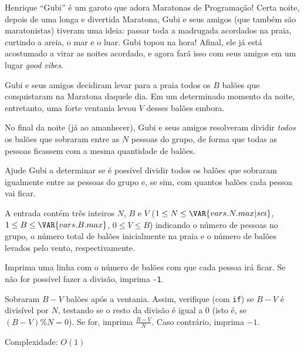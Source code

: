 Henrique ``Gubi'' é um garoto que adora Maratonas de Programação! Certa noite, depois de uma longa e divertida Maratona, Gubi e seus amigos (que também são maratonistas) tiveram uma ideia: passar toda a madrugada acordados na praia, curtindo a areia, o mar e o luar.  Gubi topou na hora! Afinal, ele já está acostumado a virar as noites acordado, e agora fará isso com seus amigos em um lugar \textit{good vibes}.

Gubi e seus amigos decidiram levar para a praia todos os $B$ balões que conquistaram na Maratona daquele dia. Em um determinado momento da noite, entretanto, uma forte ventania levou $V$ desses balões embora.

No final da noite (já ao amanhecer), Gubi e seus amigos resolveram dividir \textit{todos} os balões que sobraram entre as $N$ pessoas do grupo, de forma que todas as pessoas ficassem com a mesma quantidade de balões.

Ajude Gubi a determinar se é possível dividir todos os balões que sobraram igualmente entre as pessoas do grupo e, se sim, com quantos balões cada pessoa vai ficar.


A entrada contém três inteiros $N$, $B$ e $V$
($1 \leq N \leq \VAR{vars.N.max | sci}$, $1 \leq B \leq \VAR{vars.B.max}$, $0 \leq V \leq B$)
indicando o número de pessoas no grupo, o número total de balões inicialmente na
praia e o número de balões levados pelo vento, respectivamente.

Imprima uma linha com o número de balões com que cada pessoa irá ficar. Se não
for possível fazer a divisão, imprima \texttt{-1}.

Sobraram $B-V$ balões após a ventania. Assim, verifique (com \texttt{if}) se
$B-V$ é divisível por $N$, testando se o resto da divisão é igual a 0 (isto é,
        se $(B-V) \% N = 0$). Se for, imprima $\displaystyle\frac{B-V}{N}$. Caso contrário,
        imprima $-1$.

Complexidade: $O(1)$
